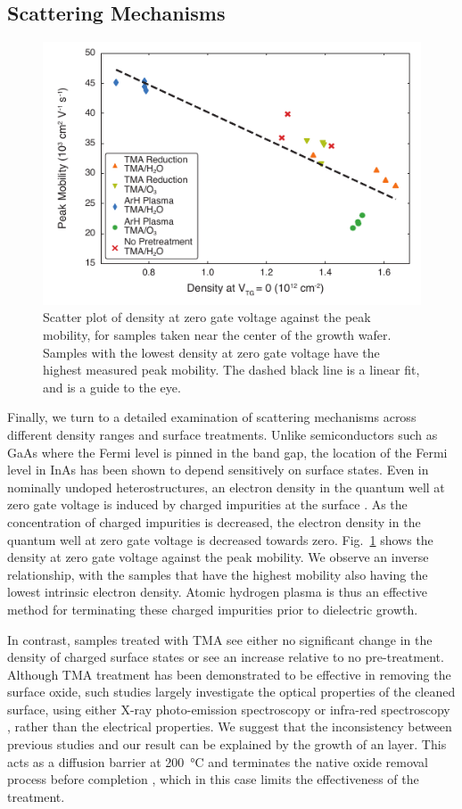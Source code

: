 \subsection{\label{sec:scat}Scattering Mechanisms}

\begin{figure}
    \includegraphics[width=0.6\linewidth]{Figure5}
    \caption[Density at zero gate voltage vs. peak mobility]{\label{fig:fig5}Scatter plot of density at zero gate voltage against the peak mobility, for samples taken near the center of the growth wafer. Samples with the lowest density at zero gate voltage have the highest measured peak mobility. The dashed black line is a linear fit, and is a guide to the eye.}
\end{figure}

Finally, we turn to a detailed examination of scattering mechanisms across different density ranges and surface treatments. Unlike semiconductors such as GaAs where the Fermi level is pinned in the band gap, the location of the Fermi level in InAs has been shown to depend sensitively on surface states. Even in nominally undoped heterostructures, an electron density in the quantum well at zero gate voltage is induced by charged impurities at the surface \cite{PhysRevLett.66.2243,Affentauschegg_2001}. As the concentration of charged impurities is decreased, the electron density in the quantum well at zero gate voltage is decreased towards zero. Fig.~\ref{fig:fig5} shows the density at zero gate voltage against the peak mobility. We observe an inverse relationship, with the samples that have the highest mobility also having the lowest intrinsic electron density.  Atomic hydrogen plasma is thus an effective method for terminating these charged impurities prior to dielectric growth.

In contrast, samples treated with TMA see either no significant change in the density of charged surface states or see an increase relative to no pre-treatment. Although TMA treatment has been demonstrated to be effective in removing the surface oxide, such studies largely investigate the optical properties of the cleaned surface, using either X-ray photo-emission spectroscopy \cite{doi:10.1063/1.3148723,Tallarida_2012,CLEVELAND2013167} or infra-red spectroscopy \cite{doi:10.1021/jp412455y}, rather than the electrical properties. We suggest that the inconsistency between previous studies and our result can be explained by the growth of an  layer. This acts as a diffusion barrier at \SI{200}{\celsius} and terminates the native oxide removal process before completion \cite{HENEGAR2016870}, which in this case limits the effectiveness of the treatment.

